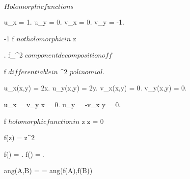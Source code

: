 \documentclass[../Main/main]{subfiles}
\begin{document}
\unit{ $ Holomorphic functions $ }
{
	
	{
		{
		}
		{
			u_x = 1.
			u_y = 0.
			v_x = 0.
			v_y = -1.

			{
				-1  \imp f $ not holomorphic in $ z
			}
		}
	}


	{
		{
			.
			f_{\R^2} $ component decomposition of f $
		}
		{
			f $ differentiable in $ \R^2 $ polinomial $.
			{
				u_x(x,y) = 2x.
				u_y(x,y) = 2y.
				v_x(x,y) = 0.
				v_y(x,y) = 0.

				u_x = v_y \ifandonlyif x = 0.
				u_y = -v_x \ifandonlyif y = 0.

				f $ holomorphic function in $ z \ifandonlyif z = 0
			}
		}
	}


	{
		{
			f(z) = z^2
		}
		{
			f() = .
			f() = .

			ang(A,B) = \pi {} = ang(f(A),f(B))
		}
	}
}
\end{document}
